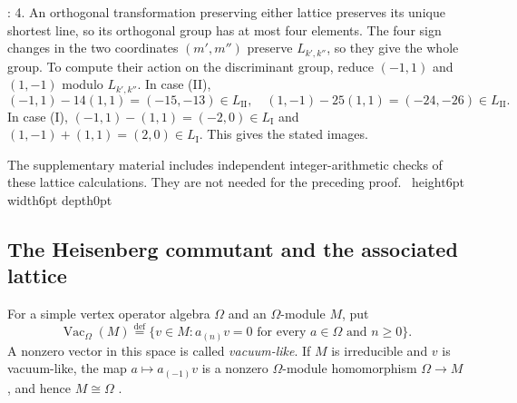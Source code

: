\documentclass[leqno]{article}
\renewcommand{\geq}{\ensuremath{\geqslant}}
\newcommand{\qed}{\hfill \vrule height6pt  width6pt depth0pt}
\newcommand{\ov}{\overset}
\newenvironment{proof}[1][]{\noindent {\it Proof #1} : }{\hbox{~}\qed
\smallskip
}
\numberwithin{equation}{section}
\begin{document}
\begin{proof}
4. An orthogonal transformation preserving either lattice preserves its unique shortest line, so its orthogonal group has at most four elements. The four sign changes in the two coordinates $(m',m'')$ preserve $L_{k',k''}$, so they give the whole group. To compute their action on the discriminant group, reduce $(-1,1)$ and $(1,-1)$ modulo $L_{k',k''}$. In case (II),
\[
(-1,1)-14(1,1) = (-15,-13) \in L_{\mathrm{II}},
\quad
(1,-1)-25(1,1) = (-24,-26) \in L_{\mathrm{II}}.
\]
In case (I), $(-1,1)-(1,1) = (-2,0) \in L_{\mathrm I}$ and $(1,-1)+(1,1) = (2,0) \in L_{\mathrm I}$. This gives the stated images.

The supplementary material includes independent integer-arithmetic checks of these lattice calculations. They are not needed for the preceding proof.
\end{proof}

\subsection{The Heisenberg commutant and the associated lattice}

For a simple vertex operator algebra $\Omega$ and an $\Omega$-module $M$, put
\[
\operatorname{Vac}_{\Omega}(M) \ov{\mathrm{def}}{=} \{v \in M : a_{(n)}v = 0 \text{ for every } a \in \Omega \text{ and } n \geq 0\}.
\]
A nonzero vector in this space is called \emph{vacuum-like}. If $M$ is irreducible and $v$ is vacuum-like, the map $a \mapsto a_{(-1)}v$ is a nonzero $\Omega$-module homomorphism $\Omega \to M$, and hence $M \cong \Omega$ \cite[Section 4.7]{LL04}.
\end{document}
